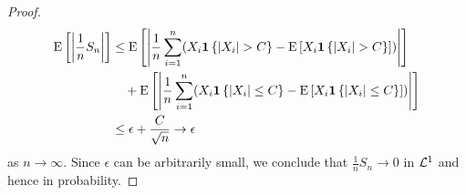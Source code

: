 \begin{proof}
\begin{equation*}
        \begin{split}
            \E\sbrc{\abs{\frac{1}{n}S_n}} &\leq \E\sbrc{\abs{\frac{1}{n}\sum_{i=1}^n\pth{X_i\one\set{\abs{X_i}>C} - \E\sbrc{X_i\one\set{\abs{X_i}>C}}}}} \\
            &\quad + \E\sbrc{\abs{\frac{1}{n}\sum_{i=1}^n\pth{X_i\one\set{\abs{X_i}\leq C} - \E\sbrc{X_i\one\set{\abs{X_i}\leq C}}}}} \\ 
            &\leq \epsilon + \frac{C}{\sqrt{n}}\to\epsilon
        \end{split}
    \end{equation*}
    as $n\to\infty$. Since $\epsilon$ can be arbitrarily small, we conclude 
    that $\frac{1}{n}S_n\to 0$ in $\mathcal{L}^1$ and hence in probability. 
\end{proof}

